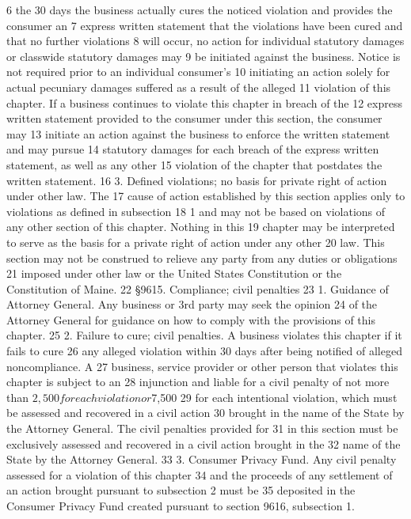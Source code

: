 6 the 30 days the business actually cures the noticed violation and provides the consumer an
7 express written statement that the violations have been cured and that no further violations
8 will occur, no action for individual statutory damages or classwide statutory damages may
9 be initiated against the business. Notice is not required prior to an individual consumer's
10 initiating an action solely for actual pecuniary damages suffered as a result of the alleged
11 violation of this chapter. If a business continues to violate this chapter in breach of the
12 express written statement provided to the consumer under this section, the consumer may
13 initiate an action against the business to enforce the written statement and may pursue
14 statutory damages for each breach of the express written statement, as well as any other
15 violation of the chapter that postdates the written statement.
16 3. Defined violations; no basis for private right of action under other law. The
17 cause of action established by this section applies only to violations as defined in subsection
18 1 and may not be based on violations of any other section of this chapter. Nothing in this
19 chapter may be interpreted to serve as the basis for a private right of action under any other
20 law. This section may not be construed to relieve any party from any duties or obligations
21 imposed under other law or the United States Constitution or the Constitution of Maine.
22 §9615. Compliance; civil penalties
23 1. Guidance of Attorney General. Any business or 3rd party may seek the opinion
24 of the Attorney General for guidance on how to comply with the provisions of this chapter.
25 2. Failure to cure; civil penalties. A business violates this chapter if it fails to cure
26 any alleged violation within 30 days after being notified of alleged noncompliance. A
27 business, service provider or other person that violates this chapter is subject to an
28 injunction and liable for a civil penalty of not more than $2,500 for each violation or $7,500
29 for each intentional violation, which must be assessed and recovered in a civil action
30 brought in the name of the State by the Attorney General. The civil penalties provided for
31 in this section must be exclusively assessed and recovered in a civil action brought in the
32 name of the State by the Attorney General.
33 3. Consumer Privacy Fund. Any civil penalty assessed for a violation of this chapter
34 and the proceeds of any settlement of an action brought pursuant to subsection 2 must be
35 deposited in the Consumer Privacy Fund created pursuant to section 9616, subsection 1.
